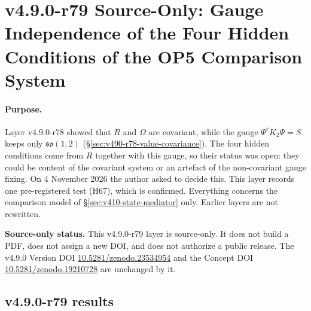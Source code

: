 \clearpage
\section*{v4.9.0-r79 Source-Only: Gauge Independence of the Four Hidden Conditions of the OP5 Comparison System}
\label{sec:v490-r79-gauge-independence}

\paragraph{Purpose.}
Layer v4.9.0-r78 showed that \(R\) and \(\Omega\) are covariant, while the gauge \(\Psi^\dagger K_2\Psi=S\) keeps only
\(\mathfrak{so}(1,2)\) (\S\ref{sec:v490-r78-value-covariance}).  The four hidden conditions come from \(R\) together with this
gauge, so their status was open: they could be content of the covariant system or an artefact of the non-covariant gauge
fixing.  On 4 November 2026 the author asked to decide this.  This layer records one pre-registered test (H67), which is
confirmed.  Everything concerns the comparison model of \S\ref{sec:v410-state-mediator} only.  Earlier layers are not
rewritten.

\noindent\textbf{Source-only status.}
This v4.9.0-r79 layer is source-only.  It does not build a PDF, does not assign a new DOI,
and does not authorize a public release.  The v4.9.0 Version DOI
\href{https://doi.org/10.5281/zenodo.23534954}{10.5281/zenodo.23534954} and the Concept DOI
\href{https://doi.org/10.5281/zenodo.19210728}{10.5281/zenodo.19210728} are unchanged by it.

\subsection*{v4.9.0-r79 results}
\label{subsec:v490-r79-results}

